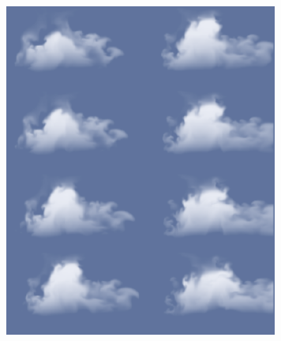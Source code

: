 \begin{figure}[h!]
	\centering
	\includegraphics[width=90mm]{images/Simulation_of_Cloud_Dynamics_on_Graphics_Hardware.PNG}
	\caption{\citet{HarrisEtAl03}}
	\label{fig:Simulation_of_Cloud_Dynamics_on_Graphics_Hardware}
\end{figure}